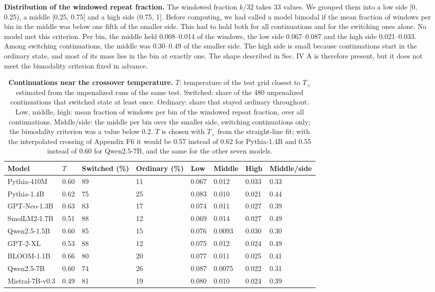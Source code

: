 \documentclass[aps,prx,onecolumn,superscriptaddress,longbibliography]{revtex4-2}
\begin{document}
\textbf{Distribution of the windowed repeat fraction.} The windowed fraction \(k/32\) takes 33 values. We grouped them into a low side {[}0, 0.25), a middle {[}0.25, 0.75{]} and a high side (0.75, 1{]}. Before computing, we had called a model bimodal if the mean fraction of windows per bin in the middle was below one fifth of the smaller side. This had to hold both for all continuations and for the switching ones alone. No model met this criterion. Per bin, the middle held 0.008--0.014 of the windows, the low side 0.067--0.087 and the high side 0.021--0.033. Among switching continuations, the middle was 0.30--0.49 of the smaller side. The high side is small because continuations start in the ordinary state, and most of its mass lies in the bin at exactly one. The shape described in Sec. IV A is therefore present, but it does not meet the bimodality criterion fixed in advance.

\begin{table}[htbp]
\centering
\small
\setlength{\tabcolsep}{6pt}
\renewcommand{\thetable}{F1}
\caption{\textbf{Continuations near the crossover temperature.} \(T\): temperature of the test grid closest to \(T_{\times}\) estimated from the unpenalized runs of the same test. Switched: share of the 480 unpenalized continuations that switched state at least once. Ordinary: share that stayed ordinary throughout. Low, middle, high: mean fraction of windows per bin of the windowed repeat fraction, over all continuations. Middle/side: the middle per bin over the smaller side, switching continuations only; the bimodality criterion was a value below 0.2. \(T\) is chosen with \(T_{\times}\) from the straight-line fit; with the interpolated crossing of Appendix F6 it would be 0.57 instead of 0.62 for Pythia-1.4B and 0.55 instead of 0.60 for Qwen2.5-7B, and the same for the other seven models.}
\label{tabF1}
\begin{tabular}{@{}llllllll@{}}
\toprule
Model & \(T\) & Switched (\%) & Ordinary (\%) & Low & Middle & High & Middle/side \\
\midrule
Pythia-410M & 0.60 & 89 & 11 & 0.067 & 0.012 & 0.033 & 0.33 \\
Pythia-1.4B & 0.62 & 75 & 25 & 0.083 & 0.010 & 0.021 & 0.44 \\
GPT-Neo-1.3B & 0.63 & 83 & 17 & 0.074 & 0.011 & 0.027 & 0.39 \\
SmolLM2-1.7B & 0.51 & 88 & 12 & 0.069 & 0.014 & 0.027 & 0.49 \\
Qwen2.5-1.5B & 0.60 & 85 & 15 & 0.076 & 0.0093 & 0.030 & 0.30 \\
GPT-2-XL & 0.53 & 88 & 12 & 0.075 & 0.012 & 0.024 & 0.49 \\
BLOOM-1.1B & 0.66 & 80 & 20 & 0.077 & 0.011 & 0.025 & 0.41 \\
Qwen2.5-7B & 0.60 & 74 & 26 & 0.087 & 0.0075 & 0.022 & 0.31 \\
Mistral-7B-v0.3 & 0.49 & 81 & 19 & 0.080 & 0.010 & 0.024 & 0.39 \\
\bottomrule
\end{tabular}
\end{table}
\end{document}
